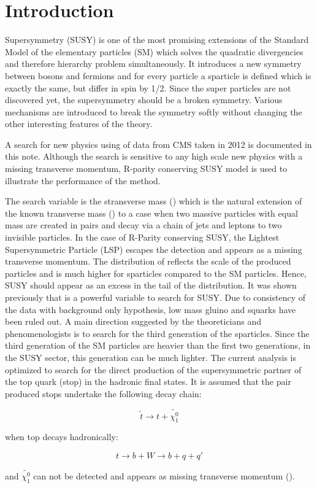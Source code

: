 \section{Introduction}
\label{sect:introduction}
Supersymmetry \cite{Martin:1997ns} (SUSY) is one of the most promising extensions of the 
Standard Model of the elementary particles (SM) which solves the 
quadratic divergencies and therefore hierarchy problem simultaneously. It introduces a new symmetry between bosons and fermions and 
for every particle a sparticle is defined which is exactly the same, but differ in spin by 1/2. 
Since the super particles are not discovered yet, the supersymmetry should be a broken symmetry. Various mechanisms are introduced to 
break the symmetry softly without changing the other interesting features of the theory.

A search for new physics using \IL of data from CMS taken in 2012 is documented in this note. Although the search is sensitive to any high scale 
new physics with a missing transverse momentum, R-parity conserving SUSY model is used to illustrate the performance of the method.

The search variable is the stransverse mass (\mttwo) which is the natural extension of the known transverse mass (\mt) to a case 
when two massive particles with equal mass are created in pairs and decay via a chain of jets and leptons to two invisible particles. 
In the case of R-Parity conserving SUSY, the Lightest Supersymmetric Particle (LSP) escapes the detection and appears as 
a missing transverse momentum.
The distribution of \mttwo reflects the scale of the produced particles and is much higher for sparticles
compared to the SM particles. Hence, SUSY should appear as an excess in the tail of the \mttwo distribution.
It was shown previously \cite{MT2_2011} that \mttwo is a powerful variable to search for SUSY. Due to consistency of the data with background 
only hypothesis, low mass gluino and squarks have been ruled out. A main direction suggested by the theoreticians and phenomenologists is to 
search for the third generation of the sparticles. %
Since the third generation of the SM particles are heavier than the first two generations, 
in the SUSY sector, this generation can be much lighter. The current analysis is optimized to search for the direct production of 
the supersymmetric partner of the top quark (stop) in the hadronic final states. It is assumed that the pair produced stops undertake the 
following decay chain:
\begin{linenomath}
\begin{equation}
\tilde{t} \rightarrow t + \tilde{\chi_{1}^{0}}
\end{equation}
\end{linenomath}
when top decays hadronically:
\begin{linenomath}
\begin{equation}
t \rightarrow b + W \rightarrow b + q + q'
\end{equation}
\end{linenomath}
and $\tilde{\chi_{1}^{0}}$ can not be detected and appears as missing transverse momentum (\met).

